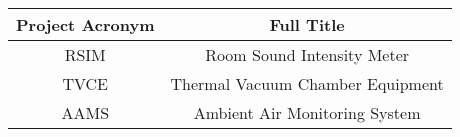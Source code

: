 \begin{tabular}{|c|c|}
\hline
Project Acronym & Full Title \\ \hline
RSIM & Room Sound Intensity Meter \\ \hline
TVCE & Thermal Vacuum Chamber Equipment \\ \hline
AAMS & Ambient Air Monitoring System \\ \hline
\end{tabular}